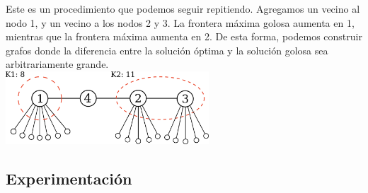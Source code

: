 Este es un procedimiento que podemos seguir repitiendo. Agregamos un vecino al nodo 1, y un vecino a los nodos 2 y 3. La frontera máxima golosa aumenta en 1, mientras que la frontera máxima aumenta en 2. De esta forma, podemos construir grafos donde la diferencia entre la solución óptima y la solución golosa sea arbitrariamente grande. \\

{\centering
    \includegraphics[width=0.57\textwidth]{informe/imgs/greedy_base_nodes_v2.png} \\
}

\subsection{Experimentación}

